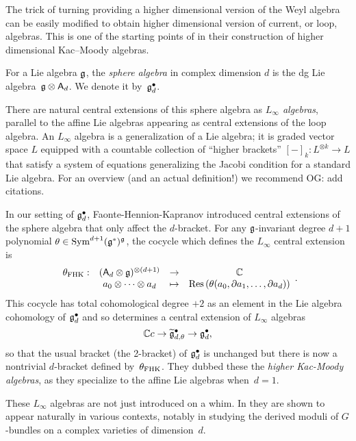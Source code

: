 \documentclass[11pt]{amsart}
\def\owen#1{{\textcolor{violet!65!black}{OG: {#1}}}}
\begin{document}
The trick of turning providing a higher dimensional version of the Weyl algebra can be easily modified to obtain higher dimensional version of current, or loop, algebras. 
This is one of the starting points of \cite{FHK} in their construction of higher dimensional Kac--Moody algebras. 

\begin{dfn}
For a Lie algebra $\mathfrak g$, the {\em sphere algebra} in complex dimension $d$ is the dg Lie algebra~$\mathfrak g \otimes \mathsf A_d$.
We denote it by~$\mathfrak g^\bullet_d$.
\end{dfn}

There are natural central extensions of this sphere algebra as {\em $L_\infty$ algebras},
parallel to the affine Lie algebras appearing as central extensions of the loop algebra.
An $L_\infty$ algebra is a generalization of a Lie algebra;
it is graded vector space $L$ equipped with a countable collection of ``higher brackets'' $[-]_k \colon L^{\otimes k} \to L$ that satisfy a system of equations generalizing the Jacobi condition for a standard Lie algebra.
For an overview (and an actual definition!) we recommend \owen{add citations}.

In our setting of $\mathfrak g^\bullet_d$, Faonte-Hennion-Kapranov introduced central extensions of the sphere algebra that only affect the $d$-bracket.
For any $\mathfrak g$-invariant degree $d+1$ polynomial $\theta \in \operatorname{Sym}^{d+1}(\mathfrak g^*)^\mathfrak g$, the cocycle which defines the $L_\infty$ central extension is
\[
\label{fhk cocycle}
\begin{array}{cccc}
\theta_{\rm FHK} : & (\mathsf A_d \otimes \mathfrak g)^{\otimes (d+1)} & \to & \mathbb C\\ 
& a_0 \otimes \cdots \otimes a_d & \mapsto & {\rm Res} \left(\theta(a_0,\partial a_1,\ldots,\partial a_d)\right)
\end{array}.
\]
This cocycle has total cohomological degree $+2$ as an element in the Lie algebra cohomology of $\mathfrak g^\bullet_{d}$ and so determines a central extension of $L_\infty$ algebras
\[
\mathbb C c \to \widetilde{\mathfrak g}^\bullet_{d, \theta} \to \mathfrak g^\bullet_d ,
\]
so that the usual bracket (the 2-bracket) of $\mathfrak g^\bullet_d$ is unchanged but there is now a nontrivial $d$-bracket defined by~$\theta_{\rm FHK}$.
They dubbed these the {\em higher Kac-Moody algebras}, 
as they specialize to the affine Lie algebras when~$d =1$.

These $L_\infty$ algebras are not just introduced on a whim.
In \cite{FHK} they are shown to appear naturally in various contexts,
notably in studying the derived moduli of $G$-bundles on a complex varieties of dimension~$d$.
\end{document}
